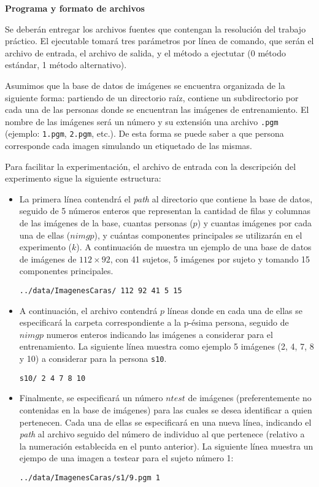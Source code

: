 {\bf Programa y formato de archivos}

Se deber\'an entregar los archivos fuentes que contengan la resoluci\'on del trabajo pr\'actico. El ejecutable tomar\'a
tres par\'ametros por l\'inea de comando, que ser\'an el archivo de entrada, el archivo de salida, y el m\'etodo a
ejectutar (0 m\'etodo est\'andar, 1 m\'etodo alternativo).


Asumimos que la base de datos de im\'agenes se encuentra organizada de la siguiente forma: partiendo de un directorio
ra\'iz, contiene un subdirectorio por cada una de las personas donde se encuentran las im\'agenes de entrenamiento. El
nombre de las im\'agenes ser\'a un n\'umero y su extensi\'on una archivo \verb+.pgm+ (ejemplo: \verb+1.pgm+,
\verb+2.pgm+, etc.). De esta forma se puede saber a que persona corresponde cada imagen simulando un etiquetado de las
mismas. 

Para facilitar la experimentaci\'on, el archivo de entrada con la descripci\'on del experimento sigue la siguiente
estructura:
\begin{itemize}
\item La primera l\'inea contendr\'a el \emph{path} al directorio que contiene la base de datos, seguido de 5 n\'umeros
enteros que representan la cantidad de filas y columnas de las im\'agenes de la base, cuantas personas ($p$) y cuantas
im\'agenes por cada una de ellas ($nimgp$), y cu\'antas componentes principales se utilizar\'an en el experimento ($k$). 
A continuaci\'on de muestra un ejemplo de una base de datos de im\'agenes de $112 \times 92$, con 41 sujetos, 5 
im\'agenes por sujeto y tomando 15 componentes principales.

\begin{verbatim}
../data/ImagenesCaras/ 112 92 41 5 15
\end{verbatim}

\item A continuaci\'on, el archivo contendr\'a $p$ l\'ineas donde en cada una de ellas se especificar\'a la carpeta
correspondiente a la p-\'esima persona, seguido de $nimgp$ numeros enteros indicando las im\'agenes a considerar para el
entrenamiento. La siguiente l\'inea muestra como ejemplo 5 im\'agenes (2, 4, 7, 8 y 10) a considerar para la persona
\verb+s10+.

\begin{verbatim}
s10/ 2 4 7 8 10
\end{verbatim}

\item Finalmente, se especificar\'a un n\'umero $ntest$ de im\'agenes (preferentemente no contenidas en la base de
im\'agenes) para las cuales se desea identificar a quien pertenecen. Cada una de ellas se especificar\'a en una nueva
l\'inea, indicando el \emph{path} al archivo seguido del n\'umero de individuo al que pertenece (relativo a la
numeraci\'on establecida en el punto anterior). La siguiente l\'inea muestra un ejempo de una imagen a testear para el
sujeto n\'umero 1:

\begin{verbatim}
../data/ImagenesCaras/s1/9.pgm 1
\end{verbatim}
\end{itemize}

